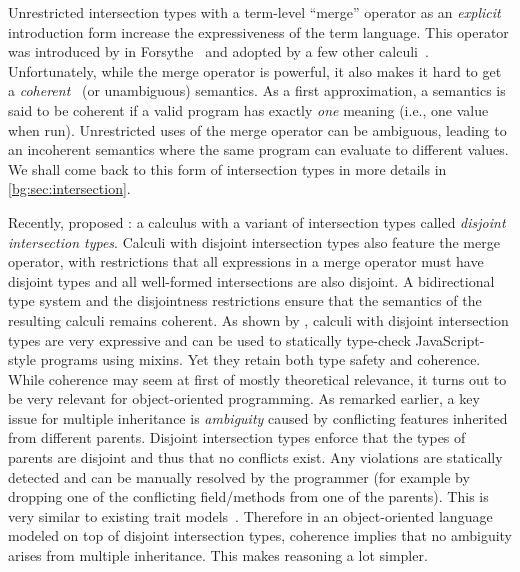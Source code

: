 Unrestricted intersection types with a term-level ``merge'' operator as an \emph{explicit}
introduction form increase the expressiveness of the term
language. This operator was introduced by \citeauthor{reynolds1988preliminary}
in Forsythe~\citep{reynolds1988preliminary} and adopted by a few other
calculi~\citep{Castagna_1992, dunfield2014elaborating, oliveira2016disjoint,
  alpuimdisjoint}. Unfortunately, while the merge operator is powerful, it also
makes it hard to get a \emph{coherent}~\citep{Reynolds_1991} (or unambiguous)
semantics. As a first approximation, a semantics is said to be coherent if a
valid program has exactly \emph{one} meaning (i.e., one value when run).
Unrestricted uses of the merge operator can be ambiguous, leading to an
incoherent semantics where the same program can evaluate to different values.
We shall come back to this form of intersection types in more details in
\cref{bg:sec:intersection}.

Recently, \citet{oliveira2016disjoint} proposed \oname: a calculus with a
variant of intersection types called \emph{disjoint intersection types}. Calculi
with disjoint intersection types also feature the merge operator, with restrictions
that all expressions in a merge operator must have disjoint types and all
well-formed intersections are also disjoint. A bidirectional type system and the
disjointness restrictions ensure that the semantics of the resulting calculi
remains coherent. As shown by \citet{alpuimdisjoint}, calculi with disjoint
intersection types are very expressive and can be used to statically type-check
JavaScript-style programs using mixins. Yet they retain both type safety and
coherence. While coherence may seem at first of mostly theoretical relevance, it
turns out to be very relevant for object-oriented programming. As remarked
earlier, a key issue for multiple inheritance is \emph{ambiguity} caused by
conflicting features inherited from different parents. Disjoint intersection
types enforce that the types of parents are disjoint and thus that no conflicts
exist. Any violations are statically detected and can be manually resolved by
the programmer (for example by dropping one of the conflicting field/methods
from one of the parents). This is very similar to existing trait
models~\citep{scharli2003traits, Ducasse_2006}. Therefore in an object-oriented language
modeled on top of disjoint intersection types, coherence implies that no
ambiguity arises from multiple inheritance. This makes reasoning a lot simpler.

